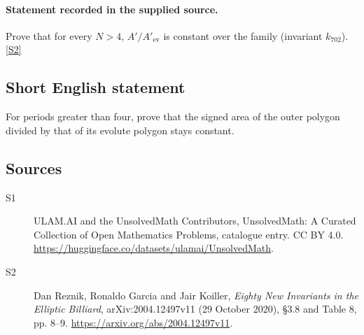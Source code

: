 \documentclass[11pt]{article}
\newcommand{\sref}[2]{\hyperlink{source:#1:#2}{[S#2]}}
\begin{document}
\paragraph{Statement recorded in the supplied source.}
Prove that for every $N>4$, $A'/A'_{\mathrm{ev}}$ is constant over the family (invariant $k_{702}$). \sref{statement}{2}
\subsection{Short English statement}
For periods greater than four, prove that the signed area of the outer polygon divided by that of its evolute polygon stays constant.
\subsection{Sources}
\begin{description}
\item[\hypertarget{source:statement:1}{S1}] ULAM.AI and the UnsolvedMath Contributors, UnsolvedMath: A Curated Collection of Open Mathematics Problems, catalogue entry. CC BY 4.0. \url{https://huggingface.co/datasets/ulamai/UnsolvedMath}.
\item[\hypertarget{source:statement:2}{S2}] Dan Reznik, Ronaldo Garcia and Jair Koiller, \emph{Eighty New Invariants in the Elliptic Billiard}, arXiv:2004.12497v11 (29 October 2020), \S3.8 and Table 8, pp. 8--9. \url{https://arxiv.org/abs/2004.12497v11}.
\end{description}
\label{end:statement}
\end{document}
